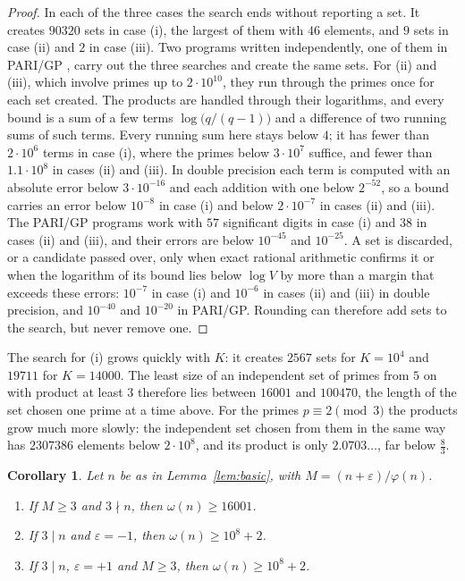 \documentclass[11pt,reqno]{amsart}
\numberwithin{equation}{section}
\theoremstyle{plain}
\newtheorem{corollary}[theorem]{Corollary}
\theoremstyle{definition}
\theoremstyle{remark}
\begin{document}
\begin{proof}
In each of the three cases the search ends without reporting a set. It
creates $90320$ sets in case (i), the largest of them with $46$
elements, and $9$ sets in case (ii) and $2$ in case (iii). Two programs
written independently, one of them in PARI/GP \cite{PARI}, carry out
the three searches and create the same sets. For (ii) and (iii), which
involve primes up to $2\cdot10^{10}$, they run through the primes once
for each set created. The products are handled through their
logarithms, and every bound is a sum of a few terms
$\log\bigl(q/(q-1)\bigr)$ and a difference of two running sums of
such terms. Every running sum here stays below $4$; it has fewer than
$2\cdot10^6$ terms in case (i), where the primes below $3\cdot10^7$
suffice, and fewer than $1.1\cdot10^8$ in cases (ii) and (iii). In
double precision each term is computed with an absolute error below
$3\cdot10^{-16}$ and each addition with one below $2^{-52}$, so a
bound carries an error below $10^{-8}$ in case (i) and below
$2\cdot10^{-7}$ in cases (ii) and (iii). The PARI/GP programs work
with $57$ significant digits in case (i) and $38$ in cases (ii) and
(iii), and their errors are below $10^{-45}$ and $10^{-25}$. A set is
discarded, or a candidate passed over, only when exact rational
arithmetic confirms it or when the logarithm of its bound lies below
$\log V$ by more than a margin that exceeds these errors: $10^{-7}$
in case (i) and $10^{-6}$ in cases (ii) and (iii) in double
precision, and $10^{-40}$ and $10^{-20}$ in PARI/GP. Rounding can
therefore add sets to the search, but never remove one.
\end{proof}

The search for (i) grows quickly with $K$: it creates $2567$ sets for
$K=10^4$ and $19711$ for $K=14000$. The least size of an independent
set of primes from $5$ on with product at least $3$ therefore lies
between $16001$ and $100470$, the length of the set chosen one prime
at a time above. For the primes $p\equiv2\pmod3$ the products grow
much more slowly: the independent set chosen from them in the same way
has $2307386$ elements below $2\cdot10^8$, and its product is only
$2.0703\ldots$, far below $\frac83$.

\begin{corollary}\label{cor:indep}
Let $n$ be as in Lemma~\ref{lem:basic}, with $M=(n+\varepsilon)/\varphi(n)$.
\begin{enumerate}[label=\textup{(\roman*)}]
\item If $M\ge3$ and $3\nmid n$, then $\omega(n)\ge16001$.
\item If $3\mid n$ and $\varepsilon=-1$, then $\omega(n)\ge10^8+2$.
\item If $3\mid n$, $\varepsilon=+1$ and $M\ge3$, then
  $\omega(n)\ge10^8+2$.
\end{enumerate}
\end{corollary}
\end{document}
